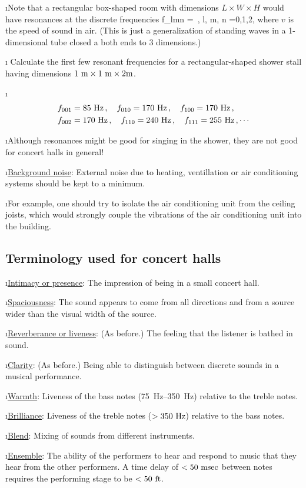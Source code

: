 \i Note that a rectangular box-shaped room with 
dimensions $L\times W\times H$
would have resonances at the discrete frequencies
%
\be
f_{lmn} = 
\,,
\qquad
l, m, n =0,1,2,\cdots
\ee
%
where $v$ is the speed of sound in air.
(This is just a generalization of standing waves in 
a 1-dimensional tube closed a both ends to 3 dimensions.)

\i \exer
Calculate the first few resonant frequencies for a 
rectangular-shaped shower stall having dimensions 
$1~{\rm m}\times 1~{\rm m}\times 2{\rm m}$.

\i \ans
%
\begin{align}
&f_{001}=85~{\rm Hz}\,,\quad
f_{010}=170~{\rm Hz}\,,\quad
f_{100}=170~{\rm Hz}\,,\quad
\\
&f_{002}=170~{\rm Hz}\,,\quad
f_{110}=240~{\rm Hz}\,,\quad
f_{111}=255~{\rm Hz}\,,\cdots
\end{align}

\i Although resonances might be good for singing in the 
shower, they are not good for concert halls in general!

\i \underline{Background noise}:
External noise due to heating, ventillation or air conditioning
systems should be kept to a minimum.

\i For example, one should try to isolate the air conditioning 
unit from the ceiling joists, which would strongly couple the 
vibrations of the air conditioning unit into the building.
 
\ei
\subsection{Terminology used for concert halls}
\bi

\i \underline{Intimacy or presence}:
The impression of being in a small concert hall.

\i \underline{Spaciousness}:
The sound appears to come from all directions and
from a source wider than the visual width of the source.

\i \underline{Reverberance or liveness}:
(As before.)
The feeling that the listener is bathed in sound.

\i \underline{Clarity}:
(As before.)
Being able to distinguish between discrete sounds in a musical
performance.

\i \underline{Warmth}:
Liveness of the bass notes (75~Hz--350~Hz) relative to the
treble notes.

\i \underline{Brilliance}:
Liveness of the treble notes ($>350~{\rm Hz}$) relative to the
bass notes.

\i \underline{Blend}:
Mixing of sounds from different instruments.

\i \underline{Ensemble}:
The ability of the performers to hear and respond to music
that they hear from the other performers.
A time delay of $< 50~{\rm msec}$ between notes 
requires the performing stage to be $< 50~{\rm ft}$.

\ei


